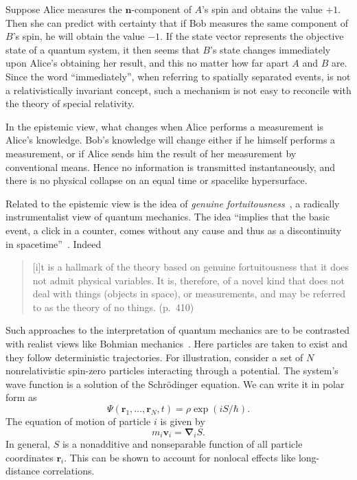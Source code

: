 \documentclass[12pt]{article}
\begin{document}
Suppose Alice measures the $\mathbf{n}$-component
of $A$'s spin and obtains the value $+1$.  Then
she can predict with certainty that if Bob measures
the same component of $B$'s spin, he will obtain the
value $-1$.  If the state vector represents the
objective state of a quantum system, it then seems that
$B$'s state changes immediately upon Alice's obtaining
her result, and this no matter how far apart $A$ and
$B$ are.  Since the word ``immediately'', when
referring to spatially separated events, is not a
relativistically invariant concept, such a mechanism is
not easy to reconcile with the theory of special relativity.

In the epistemic view, what changes when Alice
performs a measurement is Alice's knowledge.
Bob's knowledge will change either if he himself
performs a measurement, or if Alice sends him
the result of her measurement by conventional
means.  Hence no information is transmitted
instantaneously, and there is no physical collapse
on an equal time or spacelike hypersurface.

Related to the epistemic view is the idea of
\emph{genuine fortuitousness}~\cite{ulfbeck,bohr},
a radically instrumentalist view of quantum
mechanics.  The idea ``implies
that the basic event, a click in a counter, comes
without any cause and thus as a discontinuity in 
spacetime''~\cite[p.~405]{bohr}.  Indeed
%
\begin{quote}
[i]t is a hallmark of the theory based on genuine
fortuitousness that it does not admit physical variables.
It is, therefore, of a novel kind that does not deal
with things (objects in space), or measurements, and
may be referred to as the theory of no things. (p.~410)
\end{quote}
%

Such approaches to the interpretation of quantum mechanics
are to be contrasted with realist views like Bohmian
mechanics~\cite{bohm}.  Here particles are taken to
exist and they follow deterministic trajectories.
For illustration, consider a set of $N$ nonrelativistic
spin-zero particles interacting through a potential.
The system's wave function is a solution of the
Schr\"{o}dinger equation.  We can write it in polar
form as
%
\begin{equation}
\Psi (\mathbf{r}_1, \ldots, \mathbf{r}_N, t)
= \rho \exp (i S /\hbar) .
\end{equation}
%
The equation of motion of particle $i$ is given by
%
\begin{equation}
m_i \mathbf{v}_i = \boldsymbol{\nabla}_i S .
\label{motion}
\end{equation}
%
In general, $S$ is a nonadditive and nonseparable
function of all particle coordinates $\mathbf{r}_i$.
This can be shown to account for nonlocal effects
like long-distance correlations.
\end{document}
